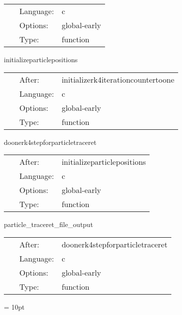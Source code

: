  \begin{tabular*}{160mm}{cll} 
~ & Language:  & c \\ 
~ & Options:  & global-early \\ 
~ & Type:  & function \\ 
\end{tabular*} 


\vspace{5mm}


\hspace{5mm} initializeparticlepositions 

\hspace{5mm}{\it initialize particle positions } 


\hspace{5mm}

 \begin{tabular*}{160mm}{cll} 
~ & After:  & initializerk4iterationcountertoone \\ 
~ & Language:  & c \\ 
~ & Options:  & global-early \\ 
~ & Type:  & function \\ 
\end{tabular*} 


\vspace{5mm}


\hspace{5mm} doonerk4stepforparticletraceret 

\hspace{5mm}{\it do one rk4 step for particle traceret } 


\hspace{5mm}

 \begin{tabular*}{160mm}{cll} 
~ & After:  & initializeparticlepositions \\ 
~ & Language:  & c \\ 
~ & Options:  & global-early \\ 
~ & Type:  & function \\ 
\end{tabular*} 


\vspace{5mm}


\hspace{5mm} particle\_traceret\_file\_output 

\hspace{5mm}{\it output particle traceret data to disk } 


\hspace{5mm}

 \begin{tabular*}{160mm}{cll} 
~ & After:  & doonerk4stepforparticletraceret \\ 
~ & Language:  & c \\ 
~ & Options:  & global-early \\ 
~ & Type:  & function \\ 
\end{tabular*} 



\vspace{5mm}\parskip = 10pt 

